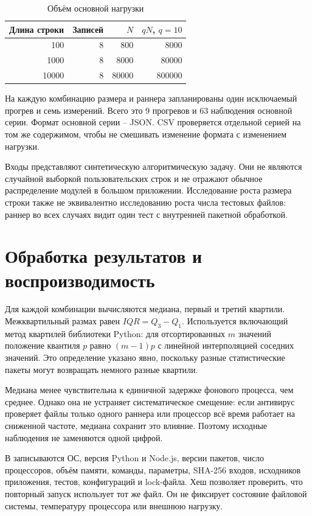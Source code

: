 \begin{table}[H]\centering
\caption{Объём основной нагрузки}
\begin{tabular}{rrrr}
\toprule
Длина строки & Записей & $N$ & $qN$, $q=10$\\\midrule
100 & 8 & 800 & 8000\\
1000 & 8 & 8000 & 80000\\
10000 & 8 & 80000 & 800000\\\bottomrule
\end{tabular}
\end{table}

На каждую комбинацию размера и раннера запланированы один исключаемый прогрев и семь измерений. Всего это 9 прогревов и 63 наблюдения основной серии. Формат основной серии -- JSON. CSV проверяется отдельной серией на том же содержимом, чтобы не смешивать изменение формата с изменением нагрузки.

Входы представляют синтетическую алгоритмическую задачу. Они не являются случайной выборкой пользовательских строк и не отражают обычное распределение модулей в большом приложении. Исследование роста размера строки также не эквивалентно исследованию роста числа тестовых файлов: раннер во всех случаях видит один тест с внутренней пакетной обработкой.

\section{Обработка результатов и воспроизводимость}
Для каждой комбинации вычисляются медиана, первый и третий квартили. Межквартильный размах равен $IQR=Q_3-Q_1$. Используется включающий метод квартилей библиотеки Python: для отсортированных $m$ значений положение квантиля $p$ равно $(m-1)p$ с линейной интерполяцией соседних значений. Это определение указано явно, поскольку разные статистические пакеты могут возвращать немного разные квартили.

Медиана менее чувствительна к единичной задержке фонового процесса, чем среднее. Однако она не устраняет систематическое смещение: если антивирус проверяет файлы только одного раннера или процессор всё время работает на сниженной частоте, медиана сохранит это влияние. Поэтому исходные наблюдения не заменяются одной цифрой.

В  записываются ОС, версия Python и Node.js, версии пакетов, число процессоров, объём памяти, команды, параметры, SHA-256 входов, исходников приложения, тестов, конфигураций и lock-файла. Хеш позволяет проверить, что повторный запуск использует тот же файл. Он не фиксирует состояние файловой системы, температуру процессора или внешнюю нагрузку.


